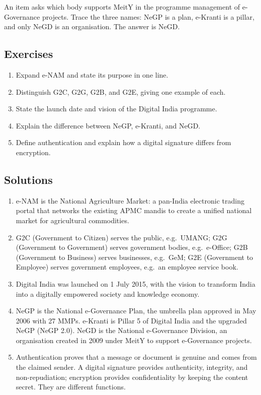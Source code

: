 \begin{example}
An item asks which body supports MeitY in the programme management of
e-Governance projects. Trace the three names: NeGP is a plan, e-Kranti is a
pillar, and only NeGD is an organisation. The answer is NeGD.
\end{example}

\subsection*{Exercises}
\begin{enumerate}[label=\arabic*.]
  \item Expand e-NAM and state its purpose in one line.
  \item Distinguish G2C, G2G, G2B, and G2E, giving one example of each.
  \item State the launch date and vision of the Digital India programme.
  \item Explain the difference between NeGP, e-Kranti, and NeGD.
  \item Define authentication and explain how a digital signature differs
    from encryption.
\end{enumerate}

\subsection*{Solutions}
\begingroup\small
\begin{enumerate}[label=\arabic*.]
  \item e-NAM is the National Agriculture Market: a pan-India electronic
    trading portal that networks the existing APMC mandis to create a
    unified national market for agricultural commodities.
  \item G2C (Government to Citizen) serves the public, e.g.\ UMANG; G2G
    (Government to Government) serves government bodies, e.g.\ e-Office;
    G2B (Government to Business) serves businesses, e.g.\ GeM; G2E
    (Government to Employee) serves government employees, e.g.\ an employee
    service book.
  \item Digital India was launched on 1 July 2015, with the vision to
    transform India into a digitally empowered society and knowledge
    economy.
  \item NeGP is the National e-Governance Plan, the umbrella plan approved
    in May 2006 with 27 MMPs. e-Kranti is Pillar 5 of Digital India and the
    upgraded NeGP (NeGP 2.0). NeGD is the National e-Governance Division, an
    organisation created in 2009 under MeitY to support e-Governance
    projects.
  \item Authentication proves that a message or document is genuine and
    comes from the claimed sender. A digital signature provides authenticity,
    integrity, and non-repudiation; encryption provides confidentiality by
    keeping the content secret. They are different functions.
\end{enumerate}
\endgroup
